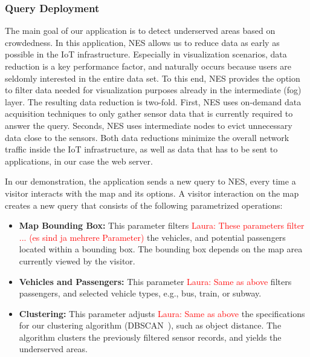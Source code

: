 \subsubsection{Query Deployment}
% 
The main goal of our application is to detect underserved areas based on crowdedness. 
In this application, NES allows us to reduce data as early as possible in the IoT infrastructure. 
Especially in visualization scenarios, data reduction is a key performance factor, and naturally occurs because users are seldomly interested in the entire data set.
To this end, NES provides the option to filter data needed for visualization purposes already in the intermediate (fog) layer. 
The resulting data reduction is two-fold. 
First, NES uses on-demand data acquisition techniques to only gather sensor data that is currently required to answer the query.
Seconds, NES uses intermediate nodes to evict unnecessary data close to the sensors.
Both data reductions minimize the overall network traffic inside the IoT infrastructure, as well as data that has to be sent to applications, in our case the web server.

In our demonstration, the application sends a new query to NES, every time a visitor interacts with the map and its options. A visitor interaction on the map creates a new query that consists of the following parametrized operations:
\begin{itemize}
  \item \textbf{Map Bounding Box:} This parameter filters \textcolor{red}{Laura: These parameters filter ... (es sind ja mehrere Parameter)} the vehicles, and potential passengers located within a bounding box. The bounding box depends on the map area currently viewed by the visitor.
  \item \textbf{Vehicles and Passengers:} This parameter \textcolor{red}{Laura: Same as above} filters passengers, and selected vehicle types, e.g., bus, train, or subway.
  \item \textbf{Clustering:} This parameter adjusts \textcolor{red}{Laura: Same as above} the specifications for our clustering algorithm (DBSCAN~\cite{dbscan}), such as object distance. The algorithm clusters the previously filtered sensor records, and yields the underserved areas. 
\end{itemize}

